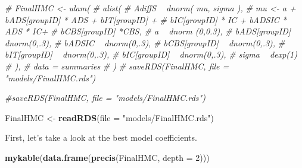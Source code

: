 \documentclass[10pt,dvipsnames,enabledeprecatedfontcommands]{scrartcl}
\newenvironment{Shaded}{\begin{snugshade}}{\end{snugshade}}
\newcommand{\KeywordTok}[1]{\textcolor[rgb]{0.13,0.29,0.53}{\textbf{#1}}}
\newcommand{\DataTypeTok}[1]{\textcolor[rgb]{0.13,0.29,0.53}{#1}}
\newcommand{\DecValTok}[1]{\textcolor[rgb]{0.00,0.00,0.81}{#1}}
\newcommand{\StringTok}[1]{\textcolor[rgb]{0.31,0.60,0.02}{#1}}
\newcommand{\CommentTok}[1]{\textcolor[rgb]{0.56,0.35,0.01}{\textit{#1}}}
\newcommand{\NormalTok}[1]{#1}
\begin{document}
\begin{Shaded}
\begin{Highlighting}[]
\CommentTok{# FinalHMC <- ulam(}
\CommentTok{#   alist(}
\CommentTok{#     AdiffS ~ dnorm( mu, sigma ),}
\CommentTok{#     mu <- a + bADS[groupID] * ADS +  bIT[groupID] +}
\CommentTok{#     bIC[groupID] * IC + bADSIC * ADS * IC+}
\CommentTok{#     bCBS[groupID] *CBS,}
\CommentTok{#     a ~ dnorm (0,0.3),}
\CommentTok{#     bADS[groupID] ~ dnorm(0,.3),}
\CommentTok{#     bADSIC ~ dnorm(0,.3),}
\CommentTok{#     bCBS[groupID] ~ dnorm(0,.3),}
\CommentTok{#     bIT[groupID] ~ dnorm(0,.3),}
\CommentTok{#     bIC[groupID] ~ dnorm(0,.3),}
\CommentTok{#     sigma  ~ dexp(1)}
\CommentTok{#   ),}
\CommentTok{#   data = summaries}
\CommentTok{# )}
\CommentTok{# saveRDS(FinalHMC, file = "models/FinalHMC.rds")}


\CommentTok{#saveRDS(FinalHMC, file = "models/FinalHMC.rds")}

\NormalTok{FinalHMC <-}\StringTok{ }\KeywordTok{readRDS}\NormalTok{(}\DataTypeTok{file =} \StringTok{"models/FinalHMC.rds"}\NormalTok{)}
\end{Highlighting}
\end{Shaded}

\normalsize
First, let's take a look at the best model coefficients.

\vspace{1mm} \footnotesize

\begin{Shaded}
\begin{Highlighting}[]
\KeywordTok{mykable}\NormalTok{(}\KeywordTok{data.frame}\NormalTok{(}\KeywordTok{precis}\NormalTok{(FinalHMC, }\DataTypeTok{depth =} \DecValTok{2}\NormalTok{)))}
\end{Highlighting}
\end{Shaded}
\end{document}
